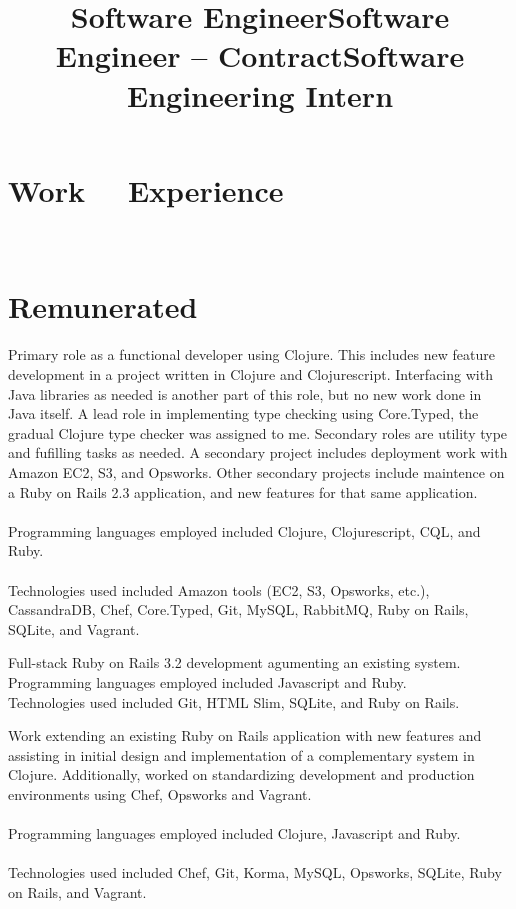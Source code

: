 \documentclass[margintitle,line]{res}
\renewcommand{\subsection}[1]{\section{\normalfont #1}}
\begin{document}
\begin{resume}
\section{Work \ \ Experience}
\ \\
\subsection{Remunerated}

\title{Software Engineer}
\begin{position}
 Primary role as a functional developer using Clojure. This includes new feature development in a project written in Clojure and Clojurescript. Interfacing with Java libraries as needed is another part of this role, but no new work done in Java itself. A lead role in implementing type checking using Core.Typed, the gradual Clojure type checker was assigned to me. Secondary roles are utility type and fufilling tasks as needed. A secondary project includes deployment work with Amazon EC2, S3, and Opsworks. Other secondary projects include maintence on a Ruby on Rails 2.3 application, and new features for that same application. \\ \ \\
 Programming languages employed included Clojure, Clojurescript, CQL, and Ruby. \\ \ \\
 Technologies used included Amazon tools (EC2, S3, Opsworks, etc.), CassandraDB, Chef, Core.Typed, Git, MySQL, RabbitMQ, Ruby on Rails, SQLite, and Vagrant.
\end{position}

\title{Software Engineer -- Contract}
\begin{position}
 Full-stack Ruby on Rails 3.2 development agumenting an existing system. \\
 Programming languages employed included Javascript and Ruby. \\
 Technologies used included Git, HTML Slim, SQLite, and Ruby on Rails.
\end{position}

\title{Software Engineering Intern}
\begin{position}
 Work extending an existing Ruby on Rails application with new features and assisting in initial design and implementation of a complementary system in  Clojure. Additionally, worked on standardizing development and production environments using Chef, Opsworks and Vagrant. \\ \ \\
 Programming languages employed included Clojure, Javascript and Ruby. \\ \ \\
 Technologies used included Chef, Git, Korma, MySQL, Opsworks, SQLite, Ruby on Rails, and Vagrant.
\end{position}


\end{resume}
\end{document}
